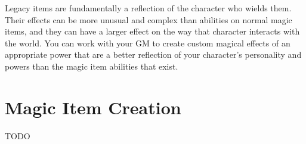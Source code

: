         Legacy items are fundamentally a reflection of the character who wields them.
        Their effects can be more unusual and complex than abilities on normal magic items, and they can have a larger effect on the way that character interacts with the world.
        You can work with your GM to create custom magical effects of an appropriate power that are a better reflection of your character's personality and powers than the magic item abilities that exist.

\section{Magic Item Creation}\label{Magic Item Creation}

    TODO
